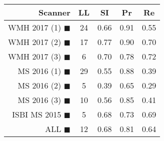 \begin{tabular}{rcccc}
\toprule
Scanner & LL & SI & Pr & Re \\
\midrule
WMH 2017 (1) {\color[rgb]{ 1.00 0.00 0.00}$\blacksquare$} & 24 & 0.66 & 0.91 & 0.55 \\
WMH 2017 (2) {\color[rgb]{ 1.00 0.50 0.00}$\blacksquare$} & 17 & 0.77 & 0.90 & 0.70 \\
WMH 2017 (3) {\color[rgb]{ 1.00 0.80 0.00}$\blacksquare$} & 6 & 0.70 & 0.78 & 0.72 \\
MS  2016 (1) {\color[rgb]{ 0.20 0.80 0.00}$\blacksquare$} & 29 & 0.55 & 0.88 & 0.39 \\
MS  2016 (2) {\color[rgb]{ 0.00 0.40 1.00}$\blacksquare$} & 5 & 0.39 & 0.65 & 0.29 \\
MS  2016 (3) {\color[rgb]{ 0.60 0.00 1.00}$\blacksquare$} & 10 & 0.56 & 0.85 & 0.41 \\
ISBI MS 2015 {\color[rgb]{ 1.00 0.00 1.00}$\blacksquare$} & 5 & 0.68 & 0.73 & 0.69 \\
\midrule
ALL {\color[rgb]{ 1.00 1.00 1.00}$\blacksquare$} & 12 & 0.68 & 0.81 & 0.64 \\
\bottomrule
\end{tabular}